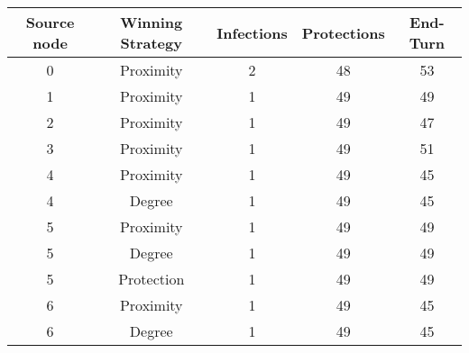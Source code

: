 \documentclass[results.tex]{subfiles}
\begin{document}
    \begin{center}
        \begin{tabular}{| c || c | c | c | c |}
            \hline
            {\bfseries Source node} & {\bfseries Winning Strategy} & {\bfseries Infections} & {\bfseries Protections}
            & {\bfseries End-Turn}
            \\  %
            \hline\hline
            0                       & Proximity                    & 2                      & 48                      & 53                   \\
            \hline
            1                       & Proximity                    & 1                      & 49                      & 49                   \\
            \hline
            2                       & Proximity                    & 1                      & 49                      & 47                   \\
            \hline
            3                       & Proximity                    & 1                      & 49                      & 51                   \\
            \hline
            4                       & Proximity                    & 1                      & 49                      & 45                   \\
            \hline
            4                       & Degree                       & 1                      & 49                      & 45                   \\
            \hline
            5                       & Proximity                    & 1                      & 49                      & 49                   \\
            \hline
            5                       & Degree                       & 1                      & 49                      & 49                   \\
            \hline
            5                       & Protection                   & 1                      & 49                      & 49                   \\
            \hline
            6                       & Proximity                    & 1                      & 49                      & 45                   \\
            \hline
            6                       & Degree                       & 1                      & 49                      & 45                   \\

\end{tabular}
\end{center}
\end{document}
